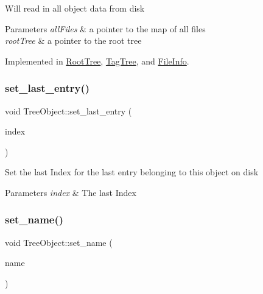 Will read in all object data from disk 
\begin{DoxyParams}{Parameters}
{\em all\+Files} & a pointer to the map of all files \\
\hline
{\em root\+Tree} & a pointer to the root tree \\
\hline
\end{DoxyParams}


Implemented in \mbox{\hyperlink{class_root_tree_a658eed78be67e890de2283af960dc532}{Root\+Tree}}, \mbox{\hyperlink{class_tag_tree_af86ee6713fa03c3909e04608512b8b62}{Tag\+Tree}}, and \mbox{\hyperlink{class_file_info_a2bf60d4be97347f3d7a15cf839afca7d}{File\+Info}}.

\mbox{\label{class_tree_object_a2ec94bc9d2647275049ddf2a70b8510e}} 
\subsubsection{\texorpdfstring{set\+\_\+last\+\_\+entry()}{set\_last\_entry()}}
{\footnotesize\ttfamily void Tree\+Object\+::set\+\_\+last\+\_\+entry (\begin{DoxyParamCaption}\item[{Index}]{index }\end{DoxyParamCaption})}

Set the last Index for the last entry belonging to this object on disk 
\begin{DoxyParams}{Parameters}
{\em index} & The last Index \\
\hline
\end{DoxyParams}
\mbox{\label{class_tree_object_a8ae7e42502b4652102e0b3c4c4e1671b}} 
\subsubsection{\texorpdfstring{set\+\_\+name()}{set\_name()}}
{\footnotesize\ttfamily void Tree\+Object\+::set\+\_\+name (\begin{DoxyParamCaption}\item[{string}]{name }\end{DoxyParamCaption})}

